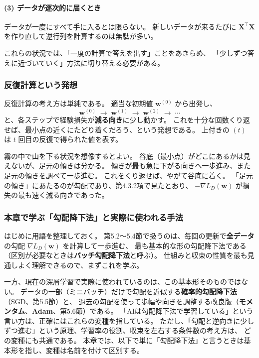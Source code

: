 \paragraph{(3) データが逐次的に届くとき}
データが一度にすべて手に入るとは限らない。
新しいデータが来るたびに $\bm{X}^\top\bm{X}$ を作り直して逆行列を計算するのは無駄が多い。

これらの状況では、「一度の計算で答えを出す」ことをあきらめ、
「少しずつ答えに近づいていく」方法に切り替える必要がある。

\subsubsection{反復計算という発想}

反復計算の考え方は単純である。
適当な初期値 $\bm{w}^{(0)}$ から出発し、
\begin{equation}
  \bm{w}^{(0)} \;\to\; \bm{w}^{(1)} \;\to\; \bm{w}^{(2)} \;\to\; \cdots
\end{equation}
と、各ステップで経験損失が\textbf{減る向き}に少し動かす。
これを十分な回数くり返せば、最小点の近くにたどり着くだろう、という発想である。
上付きの $(t)$ は $t$ 回目の反復で得られた値を表す。

霧の中で山を下る状況を想像するとよい。
谷底（最小点）がどこにあるかは見えないが、足元の傾きは分かる。
傾きが最も急に下がる向きへ一歩進み、また足元の傾きを調べて一歩進む。
これをくり返せば、やがて谷底に着く。
「足元の傾き」にあたるのが勾配であり、第4.3.2項で見たとおり、
$-\nabla L_D(\bm{w})$ が損失の最も速く減る向きであった。

\subsubsection{本章で学ぶ「勾配降下法」と実際に使われる手法}

はじめに用語を整理しておく。
第5.2〜5.4節で扱うのは、毎回の更新で\textbf{全データ}の勾配 $\nabla L_D(\bm{w})$ を計算して一歩進む、
最も基本的な形の勾配降下法である（区別が必要なときは\textbf{バッチ勾配降下法}と呼ぶ）。
仕組みと収束の性質を最も見通しよく理解できるので、まずこれを学ぶ。

一方、現在の深層学習で実際に使われているのは、この基本形そのものではない。
データの一部（ミニバッチ）だけで勾配を近似する\textbf{確率的勾配降下法}（SGD、第5.5節）と、
過去の勾配を使って歩幅や向きを調整する改良版（\textbf{モメンタム}、\textbf{Adam}、第5.6節）である。
「AIは勾配降下法で学習している」という言い方は、正確にはこれらの変種を指している。
ただし、「勾配と逆向きに少しずつ進む」という原理、学習率の役割、収束を左右する条件数の考え方は、
どの変種にも共通である。
本章では、以下で単に「勾配降下法」と言うときは基本形を指し、変種は名前を付けて区別する。


